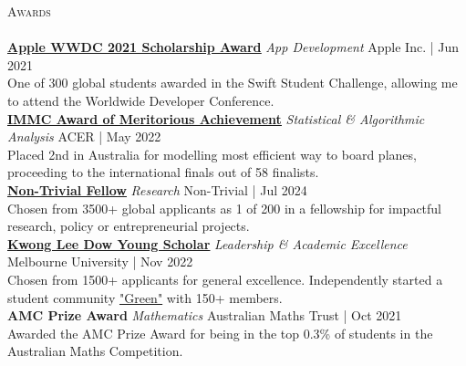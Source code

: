 \documentclass[a4paper]{article}
\newcommand{\lineunder} {
    \vspace*{-8pt} \\
    \hspace*{-10pt} \hrulefill \\
}
\newcommand{\header} [1] {
    {\hspace*{-10pt}\vspace*{6pt} \textsc{#1}}
    \vspace*{-6pt} \lineunder
}
\begin{document}
\header{Awards}
\href{https://www.wwdcscholars.com/s/DF1A5147-A993-44E4-8739-8A050139A7BA/2021}{\textbf{\ul{Apple WWDC 2021 Scholarship Award}}} \textit{App Development} \hfill Apple Inc. | Jun 2021\\
One of 300 global students awarded in the Swift Student Challenge, allowing me to attend the Worldwide Developer Conference.\\
\vspace*{1.5mm}
\href{https://www.acer.org/au/discover/article/bray-park-and-caulfield-grammar-schools-top-maths-challenge}{\textbf{\ul{IMMC Award of Meritorious Achievement}}} \textit{Statistical \& Algorithmic Analysis} \hfill ACER | May 2022\\
Placed 2nd in Australia for modelling most efficient way to board planes, proceeding to the international finals out of 58 finalists.\\
\vspace*{1.5mm}
\href{https://www.non-trivial.org/}{\textbf{\ul{Non-Trivial Fellow}}} \textit{Research} \hfill Non-Trivial | Jul 2024\\
Chosen from 3500+ global applicants as 1 of 200 in a fellowship for impactful research, policy or entrepreneurial projects.\\
\vspace*{1.5mm}
\href{https://www.linkedin.com/posts/caulfield-grammar-school_caulfieldgrammar2022-activity-7001816876439781376-DZpH}{\textbf{\ul{Kwong Lee Dow Young Scholar}}} \textit{Leadership \& Academic Excellence} \hfill Melbourne University | Nov 2022\\
Chosen from 1500+ applicants for general excellence.
Independently started a student community \href{https://garv-shah.github.io/green/}{"Green"} with 150+ members.\\
\vspace*{1.5mm}
\textbf{AMC Prize Award} \textit{Mathematics} \hfill Australian Maths Trust | Oct 2021\\
Awarded the AMC Prize Award for being in the top 0.3\% of students in the Australian Maths Competition.\\
\vspace*{1.5mm}
\end{document}
